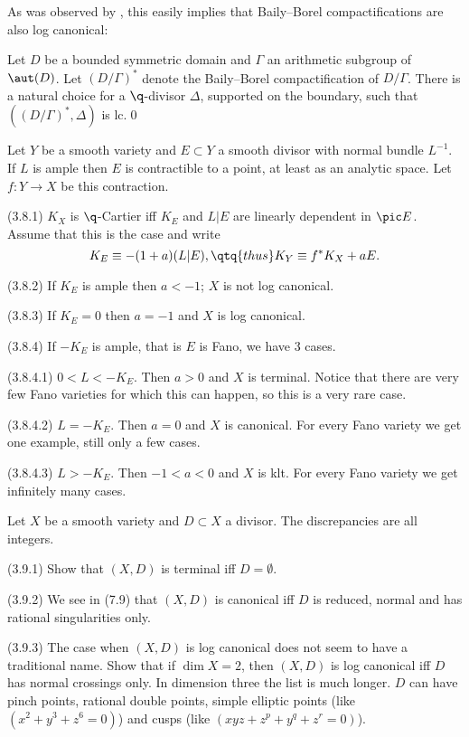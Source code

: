 As was observed by \cite{Alexeev96, Sec.3}, this easily implies that
 Baily--Borel
compactifications are also log canonical:

  Let $D$ be a bounded symmetric domain
and
$\Gamma$ an arithmetic subgroup of $\aut(D)$. Let $(D/\Gamma)^*$ denote the
Baily--Borel compactification of $D/\Gamma$. There is a natural choice for a
$\q$-divisor $\Delta$, supported on the boundary, such that
$((D/\Gamma)^*,\Delta)$ is lc.\qed
\endproclaim




Let $Y$ be a smooth variety and $E\subset Y$  a smooth divisor with normal
bundle $L^{-1}$. If $L$ is ample then $E$ is contractible to a point, at
least as an analytic space. Let
$f:Y\to X$ be this contraction. 

(3.8.1) $K_X$ is $\q$-Cartier iff $K_E$ and $L|E$ are linearly dependent in
$\pic E$. Assume that this is the case and write 
$$
K_E\equiv -(1+a)(L|E), \qtq{thus} K_Y\equiv f^*K_X+aE.
$$

(3.8.2) If $K_E$ is ample then $a<-1$; $X$ is not log canonical.

(3.8.3) If $K_E=0$ then $a=-1$ and $X$ is log canonical.

(3.8.4) If $-K_E$ is ample, that is $E$ is Fano, we have 3 cases.

(3.8.4.1) $0<L<-K_E$. Then $a>0$ and $X$ is terminal. Notice that there are
very few Fano varieties for which this can happen, so this is  a very rare case.

(3.8.4.2) $L=-K_E$. Then $a=0$ and $X$ is canonical. For every Fano variety
we get one example, still only a few cases.

(3.8.4.3) $L>-K_E$. Then $-1<a<0$ and $X$ is klt. For every Fano 
variety we get infinitely many cases.
\enddemo

  Let $X$ be a smooth variety and $D\subset X$ a
 divisor. The discrepancies are all integers. 

(3.9.1) Show that $(X,D)$ is terminal iff $D=\emptyset$. 

(3.9.2) We see in (7.9) that $(X,D)$ is canonical iff $D$ is reduced, normal
and has rational singularities only.

(3.9.3) The case when $(X,D)$ is log canonical does not seem to have a
traditional name. Show that if $\dim X=2$, then  $(X,D)$ is log canonical iff $D$
has normal crossings only. In dimension three the list is much longer. $D$ can
have pinch points, rational double points, simple elliptic points (like
$(x^2+y^3+z^6=0)$) and cusps (like $(xyz+z^p+y^q+z^r=0)$). 

